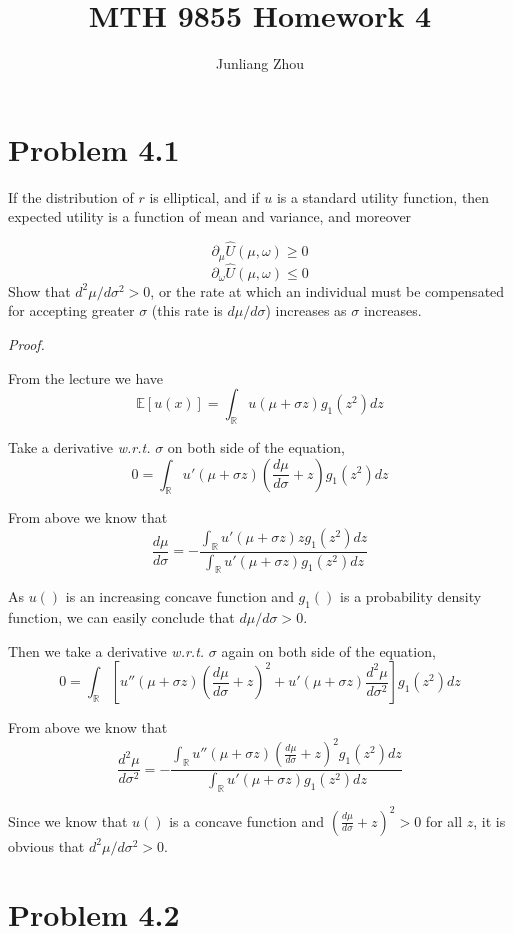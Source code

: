 \documentclass[a4paper]{article}
\title{MTH 9855 Homework 4}
\author{Junliang Zhou}
\begin{document}
\maketitle

\section{Problem 4.1}

If the distribution of $r$ is elliptical, and if $u$ is a standard utility function, then expected utility is a function of mean and variance, and moreover

\[\partial_\mu \hat U(\mu,\omega) \geq 0\]
\[\partial_\omega \hat U(\mu,\omega) \leq 0\]
Show that $d^2\mu/d\sigma^2 >0$, or the rate at which an individual must be compensated for accepting greater $\sigma$ (this rate is $d\mu/d\sigma$) increases as $\sigma$ increases.\newline

\textit{Proof.}\newline

From the lecture we have
\[\mathbb{E}[u(x)]=\int_\mathbb{R} u(\mu+\sigma z) g_1(z^2) dz\]

Take a derivative \textit{w.r.t.} $\sigma$ on both side of the equation,
\[0=\int_\mathbb{R} u'(\mu+\sigma z) \left(\frac{d\mu}{d\sigma}+z\right) g_1(z^2) dz\]

From above we know that
\[\frac{d\mu}{d\sigma}=-\frac{\int_\mathbb{R} u'(\mu+\sigma z) z g_1(z^2) dz}{\int_\mathbb{R} u'(\mu+\sigma z) g_1(z^2) dz}\]

As $u()$ is an increasing concave function and $g_1()$ is a probability density function, we can easily conclude that $d\mu/d\sigma>0$.\newline

Then we take a derivative \textit{w.r.t.} $\sigma$ again on both side of the equation,
\[0=\int_\mathbb{R} \left[ u''(\mu+\sigma z) \left(\frac{d\mu}{d\sigma}+z\right)^2 + u'(\mu+\sigma z) \frac{d^2\mu}{d\sigma^2} \right] g_1(z^2) dz\]

From above we know that
\[\frac{d^2\mu}{d\sigma^2}=-\frac{\int_\mathbb{R} u''(\mu+\sigma z) \left(\frac{d\mu}{d\sigma}+z\right)^2 g_1(z^2) dz}{\int_\mathbb{R} u'(\mu+\sigma z) g_1(z^2) dz}\]

Since we know that $u()$ is a concave function and $\left(\frac{d\mu}{d\sigma}+z\right)^2>0$ for all $z$, it is obvious that $d^2\mu/d\sigma^2 >0$.\newline

\section{Problem 4.2}
\end{document}
